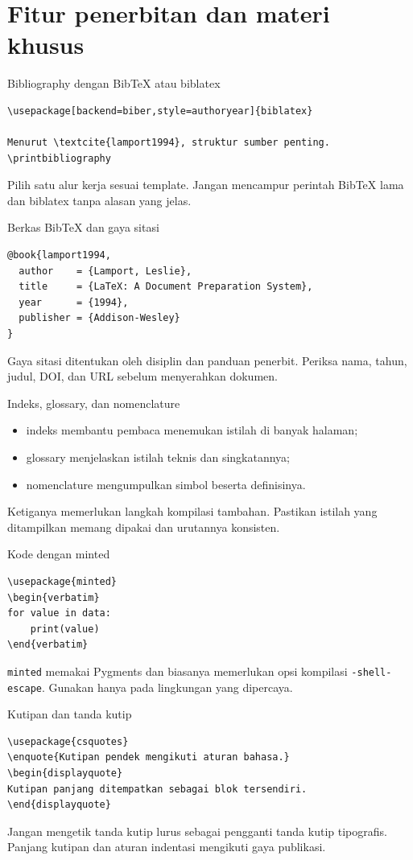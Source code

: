 \documentclass[aspectratio=169,11pt]{beamer}
\begin{document}
\section{Fitur penerbitan dan materi khusus}
\begin{frame}[fragile]{Bibliography dengan BibTeX atau biblatex}
\begin{lstlisting}
\usepackage[backend=biber,style=authoryear]{biblatex}

Menurut \textcite{lamport1994}, struktur sumber penting.
\printbibliography
\end{lstlisting}
Pilih satu alur kerja sesuai template. Jangan mencampur perintah BibTeX
lama dan biblatex tanpa alasan yang jelas.
\end{frame}
\begin{frame}[fragile]{Berkas BibTeX dan gaya sitasi}
\begin{lstlisting}[style=bib]
@book{lamport1994,
  author    = {Lamport, Leslie},
  title     = {LaTeX: A Document Preparation System},
  year      = {1994},
  publisher = {Addison-Wesley}
}
\end{lstlisting}
Gaya sitasi ditentukan oleh disiplin dan panduan penerbit. Periksa nama,
tahun, judul, DOI, dan URL sebelum menyerahkan dokumen.
\end{frame}
\begin{frame}{Indeks, glossary, dan nomenclature}
\begin{itemize}
\item indeks membantu pembaca menemukan istilah di banyak halaman;
\item glossary menjelaskan istilah teknis dan singkatannya;
\item nomenclature mengumpulkan simbol beserta definisinya.
\end{itemize}
Ketiganya memerlukan langkah kompilasi tambahan. Pastikan istilah yang
ditampilkan memang dipakai dan urutannya konsisten.
\end{frame}
\begin{frame}[fragile]{Kode dengan minted}
\begin{lstlisting}
\usepackage{minted}
\begin{verbatim}
for value in data:
    print(value)
\end{verbatim}
\end{lstlisting}
\texttt{minted} memakai Pygments dan biasanya memerlukan opsi kompilasi
\texttt{-shell-escape}. Gunakan hanya pada lingkungan yang dipercaya.
\end{frame}
\begin{frame}[fragile]{Kutipan dan tanda kutip}
\begin{lstlisting}
\usepackage{csquotes}
\enquote{Kutipan pendek mengikuti aturan bahasa.}
\begin{displayquote}
Kutipan panjang ditempatkan sebagai blok tersendiri.
\end{displayquote}
\end{lstlisting}
Jangan mengetik tanda kutip lurus sebagai pengganti tanda kutip tipografis.
Panjang kutipan dan aturan indentasi mengikuti gaya publikasi.
\end{frame}
\end{document}
